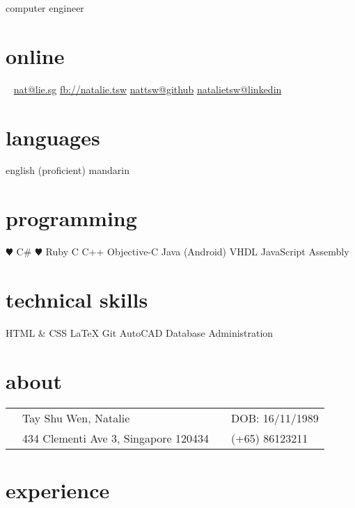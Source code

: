 \documentclass[]{friggeri-cv}
\begin{document}
{computer engineer}
\begin{aside}
	\section{online}
	\Email~ \href{mailto:nat@lie.sg}{nat@lie.sg}
	\href{https://www.facebook.com/natalie.tsw}{fb://natalie.tsw}
	\href{http://github.com/nattsw}{nattsw@github}
	\href{http://sg.linkedin.com/in/natalietsw}{natalietsw@linkedin}
	\section{languages}
	english (proficient)
	mandarin
	\section{programming}
	{\color{red} $\varheartsuit$} C\#
	{\color{red} $\varheartsuit$} Ruby
	C
	C++
	Objective-C
	Java (Android)
	VHDL
	JavaScript
	Assembly 	
	\section{technical skills}
	HTML \& CSS
	\LaTeX
	Git
	AutoCAD	
	Database Administration
\end{aside}
\section{about}
\begin{tabular}{ p{0.45cm} p{6.5cm} p{0.45cm} p{6.5cm} }
	\Female 	& Tay Shu Wen, Natalie	 & \Scorpio &  DOB: 16/11/1989\\
	\Letter & 434 Clementi Ave 3, Singapore 120434 & \Mobilefone & (+65) 86123211 \\
\end{tabular}

\section{experience}
\end{document}
